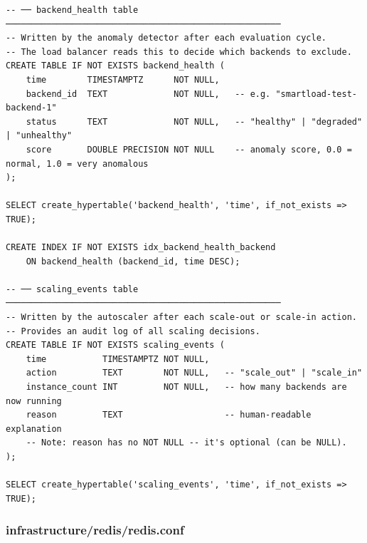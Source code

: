 \documentclass[12pt, a4paper]{article}
\begin{document}
\begin{lstlisting}[style=sql, caption={backend\_health and scaling\_events tables in init.sql}]
-- ── backend_health table ──────────────────────────────────────────────────────
-- Written by the anomaly detector after each evaluation cycle.
-- The load balancer reads this to decide which backends to exclude.
CREATE TABLE IF NOT EXISTS backend_health (
    time        TIMESTAMPTZ      NOT NULL,
    backend_id  TEXT             NOT NULL,   -- e.g. "smartload-test-backend-1"
    status      TEXT             NOT NULL,   -- "healthy" | "degraded" | "unhealthy"
    score       DOUBLE PRECISION NOT NULL    -- anomaly score, 0.0 = normal, 1.0 = very anomalous
);

SELECT create_hypertable('backend_health', 'time', if_not_exists => TRUE);

CREATE INDEX IF NOT EXISTS idx_backend_health_backend
    ON backend_health (backend_id, time DESC);

-- ── scaling_events table ──────────────────────────────────────────────────────
-- Written by the autoscaler after each scale-out or scale-in action.
-- Provides an audit log of all scaling decisions.
CREATE TABLE IF NOT EXISTS scaling_events (
    time           TIMESTAMPTZ NOT NULL,
    action         TEXT        NOT NULL,   -- "scale_out" | "scale_in"
    instance_count INT         NOT NULL,   -- how many backends are now running
    reason         TEXT                    -- human-readable explanation
    -- Note: reason has no NOT NULL -- it's optional (can be NULL).
);

SELECT create_hypertable('scaling_events', 'time', if_not_exists => TRUE);
\end{lstlisting}

\subsubsection{infrastructure/redis/redis.conf}
\end{document}
